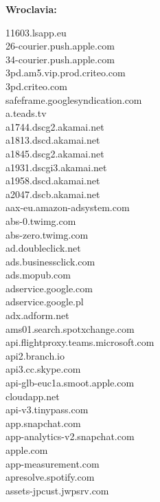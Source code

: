 \documentclass[12pt,a4paper]{article}
\begin{document}
        \textbf{Wroclavia:}\\
        \begin{scriptsize}
            \begin{multicols}{3}
                \begin{center}
                    11603.lsapp.eu\\26-courier.push.apple.com\\34-courier.push.apple.com\\3pd.am5.vip.prod.criteo.com\\
                    3pd.criteo.com\\safeframe.googlesyndication.com\\a.teads.tv\\
                    a1744.dscg2.akamai.net\\a1813.dscd.akamai.net\\a1845.dscg2.akamai.net\\a1931.dscgi3.akamai.net\\
                    a1958.dscd.akamai.net\\a2047.dscb.akamai.net\\aax-eu.amazon-adsystem.com\\abs-0.twimg.com\\abs-zero.twimg.com\\
                    ad.doubleclick.net\\ads.businessclick.com\\ads.mopub.com\\adservice.google.com\\adservice.google.pl\\
                    adx.adform.net\\ams01.search.spotxchange.com\\api.flightproxy.teams.microsoft.com\\api2.branch.io\\
                    api3.cc.skype.com\\api-glb-euc1a.smoot.apple.com\\cloudapp.net\\
                    api-v3.tinypass.com\\app.snapchat.com\\app-analytics-v2.snapchat.com\\apple.com\\app-measurement.com\\
                    apresolve.spotify.com\\assets-jpcust.jwpsrv.com\\

\end{center}
\end{multicols}
\end{scriptsize}
\end{document}
